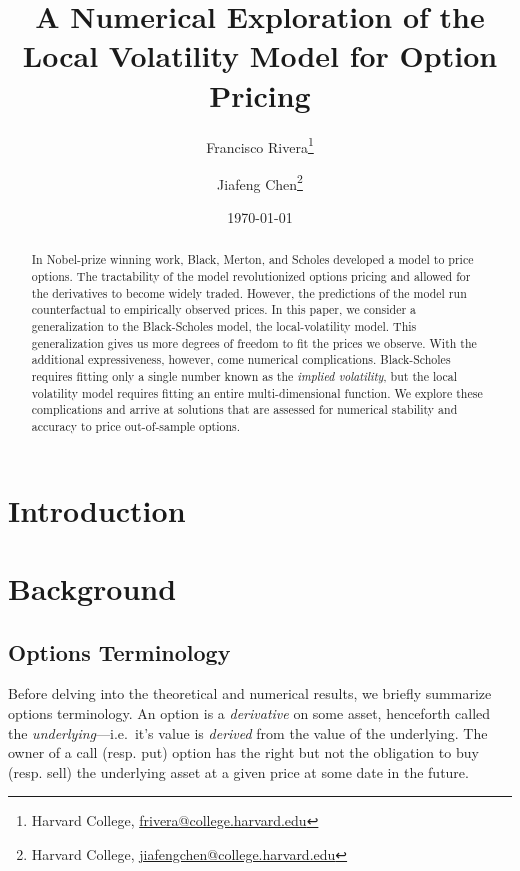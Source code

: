 \documentclass[12pt]{article}
\numberwithin{equation}{section}
\begin{document}
\onecolumn

\title{A Numerical Exploration of the Local Volatility Model for Option Pricing}
\author{Francisco Rivera\thanks{Harvard College, 
\href{mailto:frivera@college.harvard.edu}{frivera@college.harvard.edu} 
} \and Jiafeng Chen\thanks{Harvard College,
\href{mailto:jiafengchen@college.harvard.edu}{jiafengchen@college.harvard.edu}}}
\date{\today}

\maketitle

\begin{abstract}
In Nobel-prize winning work, Black, Merton, and Scholes developed a model to
price options. The tractability of the model revolutionized options pricing and
allowed for the derivatives to become widely traded. However, the predictions of
the model run counterfactual to empirically observed prices. In this paper, we
consider a generalization to the Black-Scholes model, the local-volatility
model. This generalization gives us more degrees of freedom to fit the prices we
observe. With the additional expressiveness, however, come numerical
complications. Black-Scholes requires fitting only a single number known as the
\emph{implied volatility}, but the local volatility model requires fitting an
entire multi-dimensional function. We explore these complications and arrive at
solutions that are assessed for numerical stability and accuracy to price
out-of-sample options.
\end{abstract}

\tableofcontents

\newpage

\section{Introduction}

\section{Background}
\label{sec:background}

\subsection{Options Terminology}
\label{subsec:terminology}

Before delving into the theoretical and numerical results, we briefly summarize
options terminology. An option is a \emph{derivative} on some asset, henceforth
called the \emph{underlying}---i.e.\ it's value is \emph{derived} from the value
of the underlying. The owner of a call (resp. put) option has the right but not
the obligation to buy (resp. sell) the underlying asset at a given price at some
date in the future.
\end{document}
